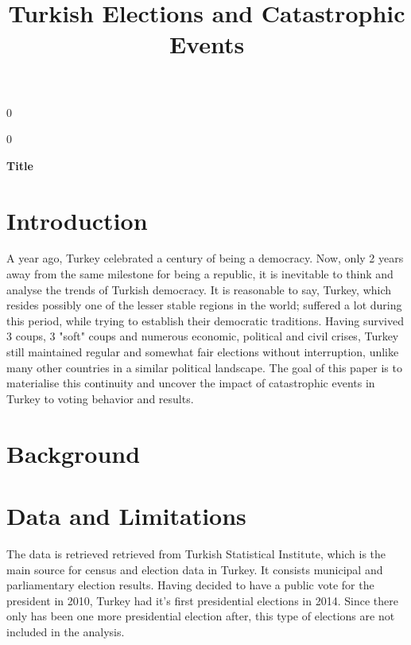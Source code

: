 \documentclass[12pt]{article}
\newcommand{\blind}{0}
\begin{document}
%

\def\spacingset#1{\renewcommand{\baselinestretch}%
{#1}\small\normalsize} \spacingset{1}



\blind
{
  \title{\bf Turkish Elections and Catastrophic Events}
    {
}

  \maketitle
} \fi

\blind
{
  \bigskip
  \bigskip
  \bigskip
  \begin{center}
    {\LARGE\bf Title}
\end{center}
  \medskip
} \fi

\spacingset{1.45} %
\section{Introduction}
\label{sec:intro}

A year ago, Turkey celebrated a century of being a democracy. Now, only 2 years away from the same milestone for being a republic, it is inevitable to think and analyse the trends of Turkish democracy. 
It is reasonable to say, Turkey, which resides possibly one of the lesser stable regions in the world; suffered a lot during this period, while trying to establish their democratic traditions. Having survived 3 coups, 3 "soft" coups and numerous economic, political and civil crises, Turkey still maintained regular and somewhat fair elections without interruption, unlike many other countries in a similar political landscape. The goal of this paper is to materialise this continuity and uncover the impact of catastrophic events in Turkey to voting behavior and results. 

\section{Background}


\section{Data and Limitations}

The data is retrieved retrieved from Turkish Statistical Institute, which is the main source for census and election data in Turkey. It consists municipal and parliamentary election results. Having decided to have a public vote for the president in 2010, Turkey had it's first presidential elections in 2014. Since there only has been one more presidential election after, this type of elections are not included in the analysis. 
\end{document}
